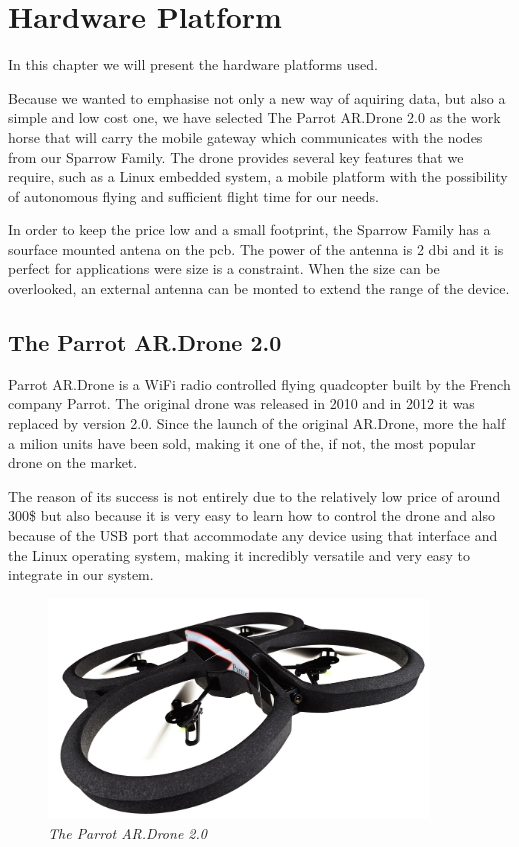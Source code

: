 \normalfont\normalsize
\chapter{Hardware Platform}

In this chapter we will present the hardware platforms used. 

Because we wanted to emphasise not only a new way of aquiring data, but also a simple and low cost one, we have selected The Parrot AR.Drone 2.0 as the work horse that will carry the mobile gateway which communicates with the nodes from our Sparrow Family. The drone provides several key features that we require, such as a Linux embedded system, a mobile platform with the possibility of autonomous flying and sufficient flight time for our needs.

In order to keep the price low and a small footprint, the Sparrow Family has a sourface mounted antena on the pcb. The power of the antenna is 2 dbi and it is perfect for applications were size is a constraint. When the size can be overlooked, an external antenna can be monted to extend the range of the device.


\section{The Parrot AR.Drone 2.0}\cite{parrot2012drone}

Parrot AR.Drone is a WiFi radio controlled flying quadcopter built by the French company Parrot.
The original drone was released in 2010 and in 2012 it was replaced by version 2.0. Since the launch of the original AR.Drone, more the half a milion units have been sold, making it one of the, if not, the most popular drone on the market.\cite{parrotpopular}

The reason of its success is not entirely due to the relatively low price of around 300\$ but also because it is very easy to learn how to control the drone and also because of the USB port that accommodate any device using that interface and the Linux operating system, making it incredibly versatile and very easy to integrate in our system.


\begin{figure}[ht]
\begin{center}
\includegraphics[width=0.9\textwidth]{hw_platform/drone.jpg}
\end{center}
\caption{\small \itshape{The Parrot AR.Drone 2.0}}
\end{figure}


